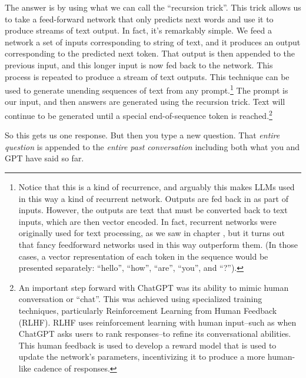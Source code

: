 The answer is by using what we can call the ``recursion trick''. This trick allows us to take a feed-forward network that only predicts next words and use it to produce streams of text output. In fact, it's remarkably simple. We feed a network a set of inputs corresponding to string of text, and it produces an output corresponding to the predicted next token. That output is then appended to the previous input, and this longer input is now fed back to the network. This process is repeated to produce a stream of text outputs. This technique can be used to generate unending sequences of text from any prompt.\footnote{Notice that this is a kind of recurrence, and arguably this makes LLMs used in this way a kind of recurrent network. Outputs are fed back in as part of inputs. However, the outputs are text that must be converted back to text inputs, which are then vector encoded. In fact, recurrent networks were originally used for text processing, as we saw in chapter , but it turns out that fancy feedforward networks used in this way outperform them. (In those cases, a vector representation of each token in the sequence would be presented separately: ``hello'', ``how'', ``are'', ``you'', and ``?'').} The prompt is our input, and then answers are generated using the recursion trick. Text will continue to be generated until a special end-of-sequence token is reached.\footnote{An important step forward with ChatGPT was its ability to mimic human conversation or ``chat''. This was achieved using specialized training techniques, particularly Reinforcement Learning from Human Feedback (RLHF). RLHF uses reinforcement learning with human input--such as when ChatGPT asks users to rank responses--to refine its conversational abilities.  This human feedback is used to develop a reward model that is used to update the network’s parameters, incentivizing it to produce a more human-like cadence of responses.} 

So this gets us one response. But then you type a new question. That \emph{entire question} is appended to the \emph{entire past conversation} including both what you and GPT have said so far. 

